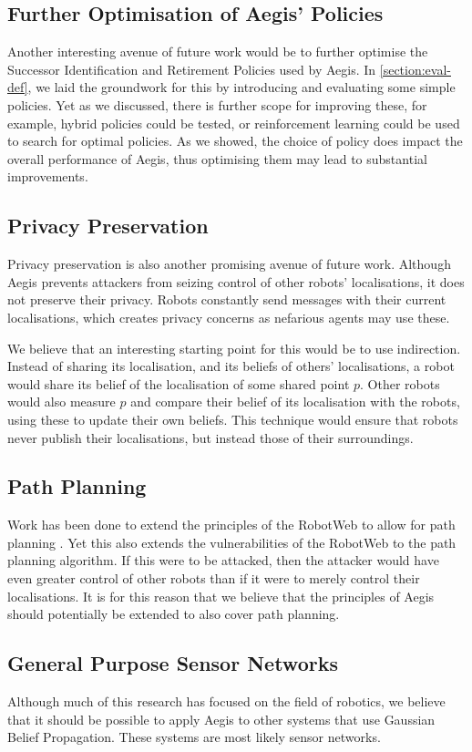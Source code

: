 \subsection{Further Optimisation of Aegis' Policies}
Another interesting avenue of future work would be to further optimise the Successor Identification and Retirement Policies used by Aegis. In \autoref{section:eval-def}, we laid the groundwork for this by introducing and evaluating some simple policies. Yet as we discussed, there is further scope for improving these, for example, hybrid policies could be tested, or reinforcement learning could be used to search for optimal policies. As we showed, the choice of policy does impact the overall performance of Aegis, thus optimising them may lead to substantial improvements.


\subsection{Privacy Preservation}
Privacy preservation is also another promising avenue of future work. Although Aegis prevents attackers from seizing control of other robots' localisations, it does not preserve their privacy. Robots constantly send messages with their current localisations, which creates privacy concerns as nefarious agents may use these.

We believe that an interesting starting point for this would be to use indirection. Instead of sharing its localisation, and its beliefs of others' localisations, a robot would share its belief of the localisation of some shared point $p$. Other robots would also measure $p$ and compare their belief of its localisation with the robots, using these to update their own beliefs. This technique would ensure that robots never publish their localisations, but instead those of their surroundings.

\subsection{Path Planning}
Work has been done to extend the principles of the RobotWeb to allow for path planning \cite{pathplanning}. Yet this also extends the vulnerabilities of the RobotWeb to the path planning algorithm. If this were to be attacked, then the attacker would have even greater control of other robots than if it were to merely control their localisations. It is for this reason that we believe that the principles of Aegis should potentially be extended to also cover path planning.

\subsection{General Purpose Sensor Networks}
Although much of this research has focused on the field of robotics, we believe that it should be possible to apply Aegis to other systems that use Gaussian Belief Propagation. These systems are most likely sensor networks.